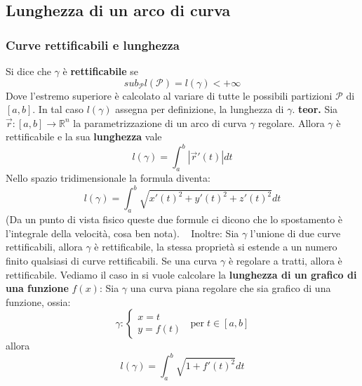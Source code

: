 \subsection{Lunghezza di un arco di curva}
\subsubsection{Curve rettificabili e lunghezza}
Si dice che $\gamma$ è \textbf{rettificabile} se 
\[
    sub_\mathcal{P} l(\mathcal{P}) = l(\gamma) < + \infty
\]
Dove l'estremo superiore è calcolato al variare di tutte le possibili partizioni $\mathcal{P}$ di $[a,b]$.\newline
In tal caso $l(\gamma)$ assegna per definizione, la lunghezza di $\gamma$.\newline
\newline
\textbf{teor.} Sia $\vec{r}:[a,b] \rightarrow \mathbb{R}^n$ la parametrizzazione di un arco di curva $\gamma$ regolare. Allora $\gamma$ è rettificabile e la sua \textbf{lunghezza} vale 
\[
    l(\gamma) = \int_{a}^{b}|\vec{r}'(t)| dt
\]
Nello spazio tridimensionale la formula diventa:
\[
    l(\gamma)= \int_{a}^{b}\sqrt{x'(t)^2 + y'(t)^2 + z'(t)^2}dt
\]
(Da un punto di vista fisico queste due formule ci dicono che lo spostamento è l'integrale della velocità, cosa ben nota).
\ \newline
Inoltre:\newline
Sia $\gamma$ l'unione di due curve rettificabili, allora $\gamma$ è rettificabile, la stessa proprietà si estende a un numero finito qualsiasi di curve rettificabili. \newline
Se una curva $\gamma$ è regolare a tratti, allora è rettificabile.\newline
\newline
Vediamo il caso in si vuole calcolare la \textbf{lunghezza di un grafico di una funzione} $f(x)$:\newline
Sia $\gamma$ una curva piana regolare che sia grafico di una funzione, ossia:
\[
    \gamma : \begin{cases}
        x =t \\
        y= f(t)
    \end{cases} \;\; \text{per} \;t \in[a,b]
\]
allora
\[
    l(\gamma) = \int_{a}^{b}\sqrt{1+f'(t)^2}dt
\]
